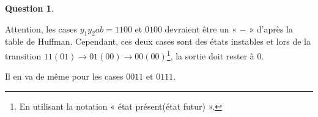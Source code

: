 \documentclass[11pt,a4paper]{article}
\theoremstyle{definition}%
\newtheorem{Q}{Question}[] %
\begin{document}
\begin{Q}
{		\begin{center}
		\end{center}

		Attention, les cases $y_1y_2ab = 1100$ et $0100$ devraient être un « $-$ » d'après la table de Huffman.
		Cependant, ces deux cases sont des états instables et lors de la transition $11(01) \rightarrow 01(00) \rightarrow 00(00)$\footnote{En utilisant la notation « état présent(état futur) ».}, la sortie doit rester à $0$.

		Il en va de même pour les cases $0011$ et $0111$.


}
\end{Q}
\end{document}
